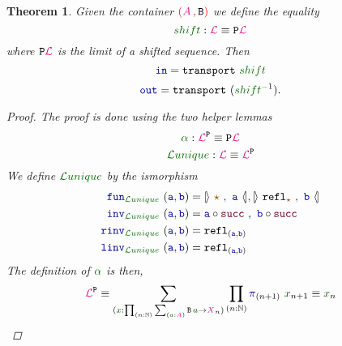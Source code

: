 \documentclass[twoside,11pt,openright]{report}
\theoremstyle{plain} %
\newtheorem{thm}{Theorem}[section]
\theoremstyle{definition}
\theoremstyle{remark}
\newcommand*{\term}[1]{\textcolor{green!30!black}{#1}} %
\newcommand*{\pathterm}[1]{\textcolor{green!40!black}{#1}}
\newcommand*{\type}[1]{\textcolor{magenta!90!black}{#1}}
\newcommand*{\containerpair}[2]{\ensuremath{\colorlet{savedleftcolor}{.}\color{red}\left(\color{savedleftcolor}#1\,\textcolor{red}{\mathbf{,}}\,#2\color{red}\right)\color{savedleftcolor}}}
\newcommand*{\constant}[1]{\textcolor{orange!60!black}{\ensuremath{\mathtt{#1}}}}
\newcommand*{\function}[1]{\textcolor{blue!60!black}{\ensuremath{\mathtt{#1}}}}
\newcommand*{\constructor}[1]{\textcolor{purple!60!black}{\ensuremath{\mathtt{#1}}}}
\newcommand*{\typeformer}[1]{\ensuremath{\mathtt{#1}}}
\newcommand*{\functor}[1]{\ensuremath{\mathbf{\mathtt{#1}}}}
\newcommand*{\unitelem}{\constant{\star}} %
\newcommand*{\natcases}[2]{\ensuremath{\mathbb{[\hspace{-.5mm}\rangle}~\ensuremath{#1}~,~\ensuremath{#2}~\mathbb{\langle\hspace{-.5mm}]}}}
\newcommand*{\sym}[1]{\ensuremath{#1^{-1}}}
\begin{document}
\begin{thm}
  \label{thm:M-shift}
   Given the container \(\containerpair{\type{A}}{\typeformer{B}}\) we define the equality
  \begin{equation}
    \pathterm{shift} : \type{\mathcal{L}} \equiv \functor{P}\type{\mathcal{L}}
  \end{equation}
  where \(\functor{P}\type{\mathcal{L}}\) is the limit of a shifted sequence. Then
  \begin{equation}
    \function{in} = \mathtt{transport}~\pathterm{shift}
  \end{equation}
  \begin{equation}
    \function{out} = \mathtt{transport}~(\sym{\pathterm{shift}}).
  \end{equation}
  \begin{proof}
    The proof is done using the two helper lemmas
    \begin{equation}
      \pathterm{\alpha} : \type{\mathcal{L}}^{\functor{P}} \equiv \functor{P}\type{\mathcal{L}}
    \end{equation}
    \begin{equation}
      \pathterm{\mathcal{L}unique} : \type{\mathcal{L}} \equiv \type{\mathcal{L}}^{\functor{P}}
    \end{equation}
    We define \(\pathterm{\mathcal{L}unique}\) by the ismorphism
    \begin{align}
      \function{fun}_{\pathterm{\mathcal{L}unique}}~(\function{a} , \function{b}) &= \natcases{\unitelem}{\function{a}} , \natcases{\mathtt{refl}_{\unitelem}}{\function{b}} \\
    \function{inv}_{\pathterm{\mathcal{L}unique}}~(\function{a} , \function{b}) &= \function{a} \circ \constructor{succ}~,~\function{b} \circ \constructor{succ} \\
    \function{rinv}_{\pathterm{\mathcal{L}unique}}~(\function{a} , \function{b}) &= \mathtt{refl}_{(\function{a},\function{b})} \\
    \function{linv}_{\pathterm{\mathcal{L}unique}}~(\function{a} , \function{b}) &= \mathtt{refl}_{(\function{a},\function{b})}
    \end{align}
    The definition of \(\pathterm{\alpha}\) is then, 
    \begin{align}
      \type{\mathcal{L}}^{\functor{P}} &\equiv \sum_{(\term{x} : \prod_{(n : \mathbb{N})} \sum_{(\term{a} : \type{A})} \typeformer{B}\,\term{a} \rightarrow \type{X}_n)} \prod_{(n : \mathbb{N})} \function{\pi}_{(n+1)}~\term{x}_{n+1} \equiv \term{x}_{n} \\

\end{align}
\end{proof}
\end{thm}
\end{document}
